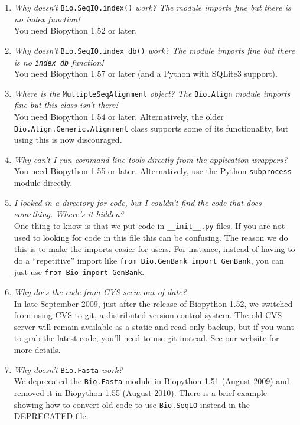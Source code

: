 \documentclass{report}
\begin{document}
\begin{enumerate}
  \item \emph{Why doesn't} \verb|Bio.SeqIO.index()| \emph{work? The module imports fine but there is no index function!} \\
  You need Biopython 1.52 or later.
  
  \item \emph{Why doesn't} \verb|Bio.SeqIO.index_db()| \emph{work? The module imports fine but there is no \texttt{index\_db} function!} \\
  You need Biopython 1.57 or later (and a Python with SQLite3 support).
  
  \item \emph{Where is the} \verb|MultipleSeqAlignment| \emph{object? The} \verb|Bio.Align| \emph{module imports fine but this class isn't there!} \\
  You need Biopython 1.54 or later. Alternatively, the older \verb|Bio.Align.Generic.Alignment| class supports some of its functionality, but using this is now discouraged.

  \item \emph{Why can't I run command line tools directly from the application wrappers?} \\
  You need Biopython 1.55 or later. Alternatively, use the Python \verb|subprocess| module directly.
  
  \item \emph{I looked in a directory for code, but I couldn't find the code that does something. Where's it hidden?} \\
  One thing to know is that we put code in \verb|__init__.py| files. If you are not used to looking for code in this file this can be confusing. The reason we do this is to make the imports easier for users. For instance, instead of having to do a ``repetitive'' import like \verb|from Bio.GenBank import GenBank|, you can just use \verb|from Bio import GenBank|.

 \item \emph{Why does the code from CVS seem out of date?} \\
  In late September 2009, just after the release of Biopython 1.52, we switched from using CVS to git, a distributed version control system. The old CVS server will remain available as a static and read only backup, but if you want to grab the latest code, you'll need to use git instead. See our website for more details.

  \item \emph{Why doesn't} \verb|Bio.Fasta| \emph{work?} \\
  We deprecated the \verb|Bio.Fasta| module in Biopython 1.51 (August 2009) and removed it in Biopython 1.55 (August 2010). There is a brief example showing how to convert old code to use \verb|Bio.SeqIO| instead in the \href{http://biopython.org/SRC/biopython/DEPRECATED}{DEPRECATED} file.

\end{enumerate}
\end{document}
